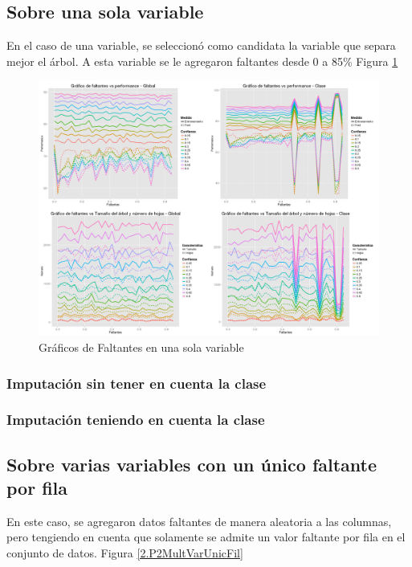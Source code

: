 \documentclass[]{article}
\begin{document}
\subsection{Sobre una sola variable}
En el caso de una variable, se seleccionó como candidata la variable que separa mejor el árbol. A esta variable se le agregaron faltantes desde 0 a 85\% Figura \ref{2.P2Unic_Var}

\begin{figure}[H]
	\includegraphics[scale = 0.27]{2_1_Unic_Col}
	\caption[Faltantes Unica variable]{Gráficos de Faltantes en una sola variable}
	\label{2.P2Unic_Var}
\end{figure}


\subsubsection{Imputación sin tener en cuenta la clase}

\subsubsection{Imputación teniendo en cuenta la clase}

\subsection{Sobre varias variables con un único faltante por fila}
En este caso, se agregaron datos faltantes de manera aleatoria a las columnas, pero tengiendo en cuenta que solamente se admite un valor faltante por fila en el conjunto de datos. Figura \ref{2.P2MultVarUnicFil} 
\end{document}
